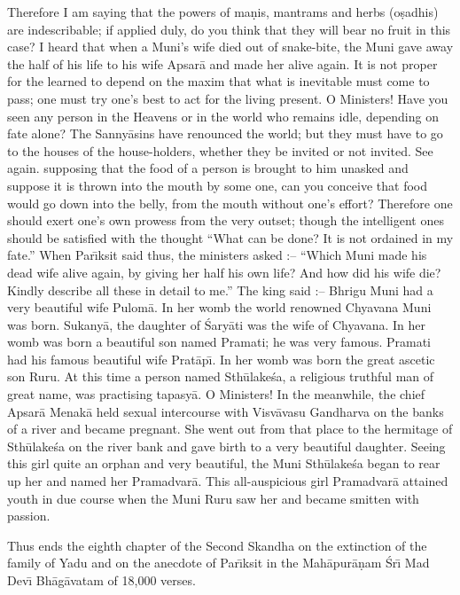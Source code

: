 Therefore I am saying that the powers of ma\d{n}is, mantrams and herbs (o\d{s}adhis) are indescribable; if applied duly, do you think that they will bear no fruit in this case? I heard that when a Muni's wife died out of snake-bite, the Muni gave away the half of his life to his wife Apsar\=a and made her alive again. It is not proper for the learned to depend on the maxim that what is inevitable must come to pass; one must try one's best to act for the living present. O Ministers! Have you seen any person in the Heavens or in the world who remains idle, depending on fate alone? The Sanny\=asins have renounced the world; but they must have to go to the houses of the house-holders, whether they be invited or not invited. See again. supposing that the food of a person is brought to him unasked and suppose it is thrown into the mouth by some one, can you conceive that food would go down into the belly, from the mouth without one's effort? Therefore one should exert one's own prowess from the very outset; though the intelligent ones should be satisfied with the thought ``What can be done? It is not ordained in my fate.'' When Par\={\i}ksit said thus, the ministers asked :-- ``Which Muni made his dead wife alive again, by giving her half his own life? And how did his wife die? Kindly describe all these in detail to me.'' The king said :-- Bhrigu Muni had a very beautiful wife Pulom\=a. In her womb the world renowned Chyavana Muni was born. Sukany\=a, the daughter of \'Sary\=ati was the wife of Chyavana. In her womb was born a beautiful son named Pramati; he was very famous. Pramati had his famous beautiful wife Prat\=ap\={\i}. In her womb was born the great ascetic son Ruru. At this time a person named Sth\=ulake\'sa, a religious truthful man of great name, was practising tapasy\=a. O Ministers! In the meanwhile, the chief Apsar\=a Menak\=a held sexual intercourse with Visv\=avasu Gandharva on the banks of a river and became pregnant. She went out from that place to the hermitage of Sth\=ulake\'sa on the river bank and gave birth to a very beautiful daughter. Seeing this girl quite an orphan and very beautiful, the Muni Sth\=ulake\'sa began to rear up her and named her Pramadvar\=a. This all-auspicious girl Pramadvar\=a attained youth in due course when the Muni Ruru saw her and became smitten with passion.

Thus ends the eighth chapter of the Second Skandha on the extinction of the family of Yadu and on the anecdote of Par\={\i}ksit in the Mah\=apur\=a\d{n}am \'Sr\={\i} Mad Dev\={\i} Bh\=ag\=avatam of 18,000 verses.



